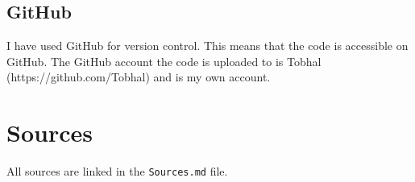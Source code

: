 \documentclass[10pt]{article}
\begin{document}
    \subsection{GitHub}
    I have used GitHub for version control. This means that the code is accessible on GitHub. The GitHub account the code is uploaded to is Tobhal (https://github.com/Tobhal) and is my own account.

    \section{Sources}
    All sources are linked in the \texttt{Sources.md} file.
\end{document}
